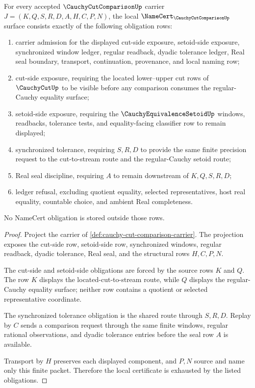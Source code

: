 \begin{theorem}
\label{thm:cauchy-cut-comparison-namecert-obligations}
For every accepted $\CauchyCutComparisonUp$ carrier $J=(K,Q,S,R,D,A,H,C,P,N)$, the local $\NameCert_{\CauchyCutComparisonUp}$ surface consists exactly of the following obligation rows:
\begin{enumerate}
\item carrier admission for the displayed cut-side exposure, setoid-side exposure, synchronized window ledger, regular readback, dyadic tolerance ledger, Real seal boundary, transport, continuation, provenance, and local naming row;
\item cut-side exposure, requiring the located lower--upper cut rows of $\CauchyCutUp$ to be visible before any comparison consumes the regular-Cauchy equality surface;
\item setoid-side exposure, requiring the $\CauchyEquivalenceSetoidUp$ windows, readbacks, tolerance tests, and equality-facing classifier row to remain displayed;
\item synchronized tolerance, requiring $S,R,D$ to provide the same finite precision request to the cut-to-stream route and the regular-Cauchy setoid route;
\item Real seal discipline, requiring $A$ to remain downstream of $K,Q,S,R,D$;
\item ledger refusal, excluding quotient equality, selected representatives, host real equality, countable choice, and ambient Real completeness.
\end{enumerate}
No NameCert obligation is stored outside those rows.
\end{theorem}
\begin{proof}
Project the carrier of \autoref{def:cauchy-cut-comparison-carrier}. The projection exposes the cut-side row, setoid-side row, synchronized windows, regular readback, dyadic tolerance, Real seal, and the structural rows $H,C,P,N$.

The cut-side and setoid-side obligations are forced by the source rows $K$ and $Q$. The row $K$ displays the located-cut-to-stream route, while $Q$ displays the regular-Cauchy equality surface; neither row contains a quotient or selected representative coordinate.

The synchronized tolerance obligation is the shared route through $S,R,D$. Replay by $C$ sends a comparison request through the same finite windows, regular rational observations, and dyadic tolerance entries before the seal row $A$ is available.

Transport by $H$ preserves each displayed component, and $P,N$ source and name only this finite packet. Therefore the local certificate is exhausted by the listed obligations.
\end{proof}

